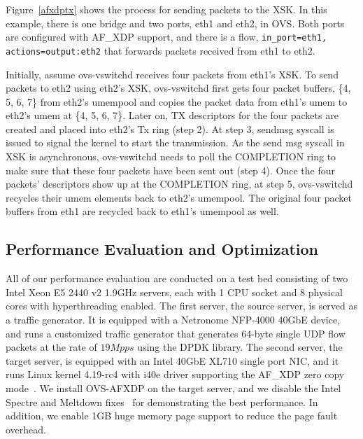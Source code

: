 \documentclass[10pt,numbers,reprint]{sigplanconf}
\begin{document}
Figure~\ref{afxdptx} shows the process for sending packets to the XSK.
In this example, there is one bridge and two ports, eth1 and eth2, in OVS.
Both ports are configured with AF\_XDP support, and there is a flow,
\texttt{in\_port=eth1, actions=output:eth2} that forwards
packets received from eth1 to eth2.

Initially, assume ovs-vswitchd receives four packets from eth1's XSK.
To send packets to eth2 using eth2's XSK, ovs-vswitchd first gets four packet buffers,
\{4, 5, 6, 7\} from eth2's umempool and copies the packet data from eth1's umem
to eth2's umem at \{4, 5, 6, 7\}.  Later on, TX descriptors for the four packets are
created and placed into eth2's Tx ring (step 2).
At step 3, sendmsg syscall is issued to signal the kernel to start the transmission.
As the send msg syscall in XSK is asynchronous, ovs-vswitchd needs to poll
the COMPLETION ring to make sure that these four packets have been sent out
(step 4).
Once the four packets' descriptors show up at the COMPLETION ring, at step 5,
ovs-vswitchd recycles their umem elements back to eth2's umempool.
The original four packet buffers from eth1 are recycled back to eth1's
umempool as well.

\subsection{Performance Evaluation and Optimization}
All of our performance evaluation are conducted on a test bed consisting of
two Intel Xeon E5 2440 v2 1.9GHz servers, each with 1 CPU socket and
8 physical cores with hyperthreading enabled.
The first server, the source server, is served as a traffic generator.
It is equipped with a Netronome NFP-4000 40GbE device, and runs a customized
traffic generator that generates 64-byte single UDP flow packets
at the rate of $19Mpps$ using the DPDK library.
The second server, the target server, is equipped with an Intel 40GbE XL710
single port NIC, and it runs Linux kernel 4.19-rc4 with i40e driver supporting
the AF\_XDP zero copy mode~\cite{af_xdp_patch_i40e, af_xdp_patch_zc}.
We install OVS-AFXDP on the target server, and
we disable the Intel Spectre and Meltdown fixes~\cite{jesper_xdp_perf_drop, retpoline}
for demonstrating the best performance. In addition, we enable 1GB huge
memory page support to reduce the page fault overhead.
\end{document}
